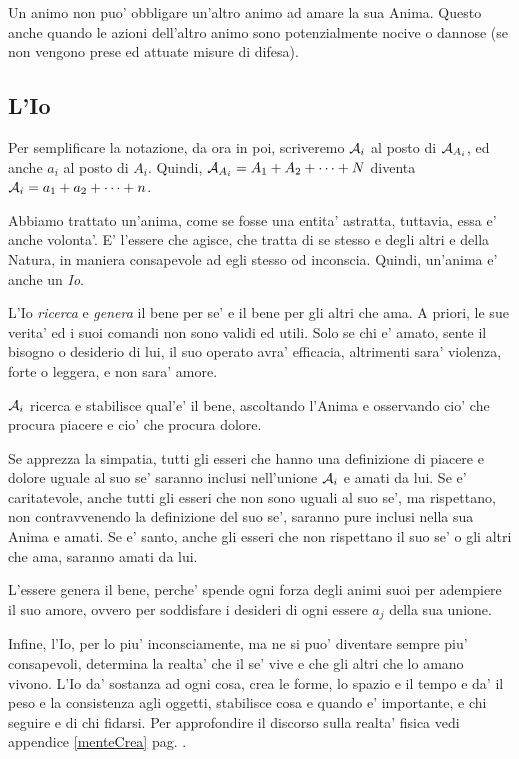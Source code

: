 Un animo non puo' obbligare un'altro animo ad amare la sua Anima. Questo anche quando le azioni dell'altro animo sono potenzialmente nocive o dannose (se non vengono prese ed attuate misure di difesa).


\def\Dio{D}


\subsection{L'Io}

Per semplificare la notazione, da ora in poi, scriveremo $\mathcal{A}_i$ al posto di $\mathcal{A}_{A_i}$, ed anche $a_i$ al posto di $A_i$. Quindi, $\mathcal{A}_{A_i}=A_1+A_2+\cdots+N$ diventa $\mathcal{A}_i=a_1+a_2+\cdots+n$. %

\def\Io{\textrm{Io}}

\def\esAi{\anima{A}_i}
\def\esAj{\anima{A}_j}
\def\esAE{\anima{A}_E}

    Abbiamo trattato un'anima, come se fosse una entita' astratta, tuttavia, essa e' anche volonta'. E' l'essere che agisce, che tratta di se stesso e degli altri e della Natura, in maniera consapevole ad egli stesso od inconscia. Quindi, un'anima e' anche un \emph{Io}.

    L'Io \emph{ricerca} e \emph{genera} il bene per se' e il bene per gli altri che ama. A priori, le sue verita' ed i suoi comandi non sono validi ed utili. Solo se chi e' amato, sente il bisogno o desiderio di lui, il suo operato avra' efficacia, altrimenti sara' violenza, forte o leggera, e non sara' amore.

    $\esAi$ ricerca e stabilisce qual'e' il bene, ascoltando l'Anima e osservando cio' che procura piacere e cio' che procura dolore. 

    Se apprezza la simpatia, tutti gli esseri che hanno una definizione di piacere e dolore uguale al suo se' saranno inclusi nell'unione $\esAi$ e amati da lui. Se e' caritatevole, anche tutti gli esseri che non sono uguali al suo se', ma rispettano, non contravvenendo la definizione del suo se', saranno pure inclusi nella sua Anima e amati. Se e' santo, anche gli esseri che non rispettano il suo se' o gli altri che ama, saranno amati da lui.

    L'essere genera il bene, perche' spende ogni forza degli animi suoi per adempiere il suo amore, ovvero per soddisfare i desideri di ogni essere $a_j$ della sua unione.

    Infine, l'Io, per lo piu' inconsciamente, ma ne si puo' diventare sempre piu' consapevoli, determina la realta' che il se' vive e che gli altri che lo amano vivono. L'Io da' sostanza ad ogni cosa, crea le forme, lo spazio e il tempo e da' il peso e la consistenza agli oggetti, stabilisce cosa e quando e' importante, e chi seguire e di chi fidarsi. Per approfondire il discorso sulla realta' fisica vedi appendice \ref{menteCrea} pag. \pageref{menteCrea}.

